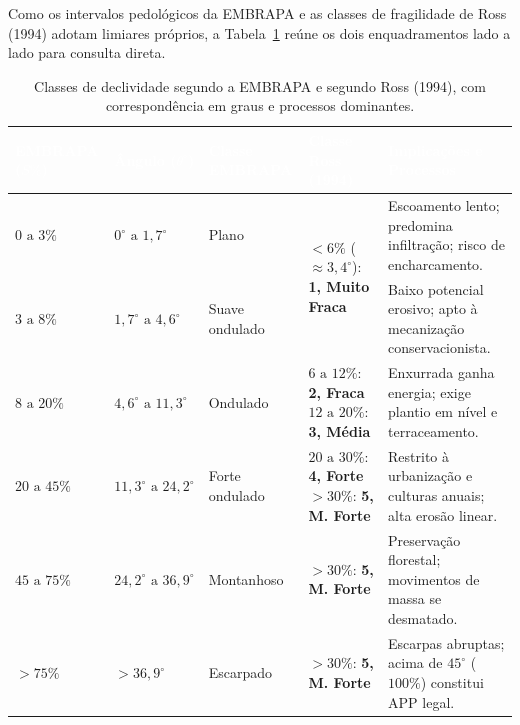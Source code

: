 Como os intervalos pedológicos da EMBRAPA e as classes de fragilidade de Ross (1994) adotam limiares próprios, a Tabela~\ref{tab:classes_declividade} reúne os dois enquadramentos lado a lado para consulta direta.

\begin{table}[H]
\centering
\caption{Classes de declividade segundo a EMBRAPA e segundo Ross (1994), com correspondência em graus e processos dominantes.}
\label{tab:classes_declividade}
\renewcommand{\arraystretch}{1.18}
\small
\begin{tabularx}{\textwidth}{@{}p{2.3cm} p{2.1cm} p{2.6cm} p{2.5cm} >{\raggedright\arraybackslash}X@{}}
  \toprule
  \rowcolor{uefsNavy}
  \textcolor{white}{\bfseries EMBRAPA ($S\%$)} & \textcolor{white}{\bfseries Ângulo ($\theta^\circ$)} & \textcolor{white}{\bfseries Classe EMBRAPA} & \textcolor{white}{\bfseries Classe Ross (1994)} & \textcolor{white}{\bfseries Implicações e Processos} \\
  \midrule
  $0\text{ a } 3\%$ & $0^\circ\text{ a } 1{,}7^\circ$ & Plano & \multirow{2}{2.5cm}{$< 6\%$ ($\approx 3{,}4^\circ$): \newline \textbf{1, Muito Fraca}} & Escoamento lento; predomina infiltração; risco de encharcamento. \\
  \rowcolor{bgGray}
  $3\text{ a } 8\%$ & $1{,}7^\circ\text{ a } 4{,}6^\circ$ & Suave ondulado & & Baixo potencial erosivo; apto à mecanização conservacionista. \\
  $8\text{ a } 20\%$ & $4{,}6^\circ\text{ a } 11{,}3^\circ$ & Ondulado & $6\text{ a } 12\%$: \textbf{2, Fraca} \newline $12\text{ a } 20\%$: \textbf{3, Média} & Enxurrada ganha energia; exige plantio em nível e terraceamento. \\
  \rowcolor{bgGray}
  $20\text{ a } 45\%$ & $11{,}3^\circ\text{ a } 24{,}2^\circ$ & Forte ondulado & $20\text{ a } 30\%$: \textbf{4, Forte} \newline $> 30\%$: \textbf{5, M. Forte} & Restrito à urbanização e culturas anuais; alta erosão linear. \\
  $45\text{ a } 75\%$ & $24{,}2^\circ\text{ a } 36{,}9^\circ$ & Montanhoso & $> 30\%$: \textbf{5, M. Forte} & Preservação florestal; movimentos de massa se desmatado. \\
  \rowcolor{bgGray}
  $> 75\%$ & $> 36{,}9^\circ$ & Escarpado & $> 30\%$: \textbf{5, M. Forte} & Escarpas abruptas; acima de $45^\circ$ ($100\%$) constitui APP legal. \\
  \bottomrule
\end{tabularx}
\end{table}


